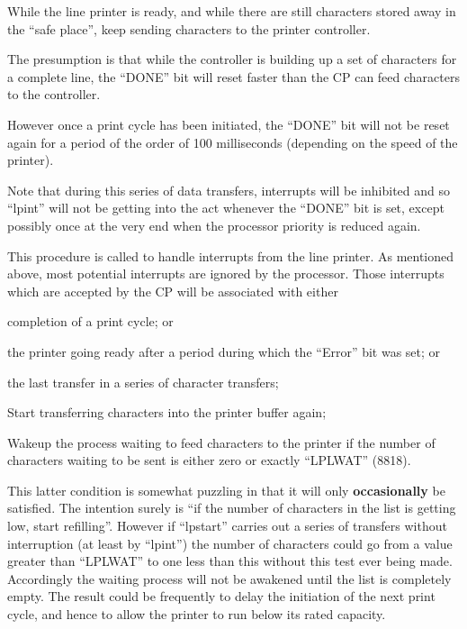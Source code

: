 
While the line printer is ready, and
while there are still characters stored
away in the ``safe place'', keep sending
characters to the printer controller.

The presumption is that while the controller
is building up a set of characters for a complete line, the ``DONE''
bit will reset faster than the CP can
feed characters to the controller.

However once a print cycle has been
initiated, the ``DONE'' bit will not be
reset again for a period of the order
of 100 milliseconds (depending on the
speed of the printer).

Note that during this series of data
transfers, interrupts will be inhibited
and so ``lpint'' will not be getting into
the act whenever the ``DONE'' bit is set,
except possibly once at the very end
when the processor priority is reduced
again.


This procedure is called to handle
interrupts from the line printer. As
mentioned above, most potential interrupts are ignored by the processor.
Those interrupts which are accepted by
the CP will be associated with either

\bd
\item[(a)] completion of a print cycle; or

\item[(b)] the printer going ready after a
period during which the ``Error''
bit was set; or

\item[(c)] the last transfer in a series of
	character transfers;
\ed

\bd
\item[8980:] Start transferring characters
into the printer buffer again;

\item[8981:] Wakeup the process waiting to
feed characters to the printer if
the number of characters waiting
to be sent is either zero or
exactly ``LPLWAT'' (8818).
\ed

This latter condition is somewhat puzzling
in that it will only {\bf occasionally}
be satisfied. The intention surely is
``if the number of characters in the
list is getting low, start refilling''.
However if ``lpstart'' carries out a
series of transfers without interruption (at least by ``lpint'') the number
of characters could go from a value
greater than ``LPLWAT'' to one less than
this without this test ever being made.
Accordingly the waiting process will
not be awakened until the list is completely empty.
The result could be frequently to delay the initiation of the
next print cycle, and hence to allow
the printer to run below its rated
capacity.


